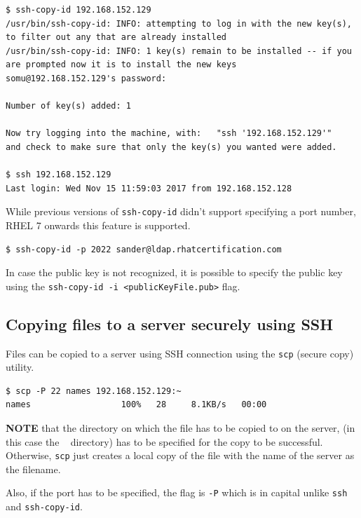 \begin{verbatim}
$ ssh-copy-id 192.168.152.129
/usr/bin/ssh-copy-id: INFO: attempting to log in with the new key(s), to filter out any that are already installed
/usr/bin/ssh-copy-id: INFO: 1 key(s) remain to be installed -- if you are prompted now it is to install the new keys
somu@192.168.152.129's password: 

Number of key(s) added: 1

Now try logging into the machine, with:   "ssh '192.168.152.129'"
and check to make sure that only the key(s) you wanted were added.

$ ssh 192.168.152.129
Last login: Wed Nov 15 11:59:03 2017 from 192.168.152.128
\end{verbatim}

While previous versions of \verb|ssh-copy-id| didn't support specifying a port number, RHEL 7 onwards this feature is supported. 

\begin{verbatim}
$ ssh-copy-id -p 2022 sander@ldap.rhatcertification.com
\end{verbatim}

In case the public key is not recognized, it is possible to specify the public key using the \verb|ssh-copy-id -i <publicKeyFile.pub>| flag.

\subsection{Copying files to a server securely using SSH}
Files can be copied to a server using SSH connection using the \verb|scp| (secure copy) utility. 

\begin{verbatim}
$ scp -P 22 names 192.168.152.129:~
names                  100%   28     8.1KB/s   00:00    
\end{verbatim}

\noindent
\textbf{NOTE} that the directory on which the file has to be copied to on the server, (in this case the ~ directory) has to be specified for the copy to be successful. Otherwise, \verb|scp| just creates a local copy of the file with the name of the server as the filename. 

Also, if the port has to be specified, the flag is \verb|-P| which is in capital unlike \verb|ssh| and \verb|ssh-copy-id|.